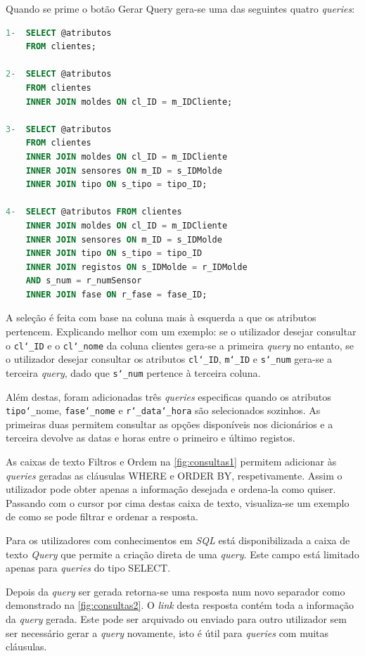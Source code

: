 \documentclass[11pt,twoside,a4paper]{report}
\begin{document}
\newpage
Quando  se prime o botão Gerar Query gera-se uma das seguintes quatro \textit{queries}:
\begin{lstlisting}[language = SQL]
1-	SELECT @atributos
	FROM clientes;
	
2-	SELECT @atributos
	FROM clientes
	INNER JOIN moldes ON cl_ID = m_IDCliente;
	
3-	SELECT @atributos
	FROM clientes
	INNER JOIN moldes ON cl_ID = m_IDCliente
	INNER JOIN sensores ON m_ID = s_IDMolde
	INNER JOIN tipo ON s_tipo = tipo_ID;
	
4-	SELECT @atributos FROM clientes
	INNER JOIN moldes ON cl_ID = m_IDCliente
	INNER JOIN sensores ON m_ID = s_IDMolde 
	INNER JOIN tipo ON s_tipo = tipo_ID
	INNER JOIN registos ON s_IDMolde = r_IDMolde
	AND s_num = r_numSensor
	INNER JOIN fase ON r_fase = fase_ID;
\end{lstlisting}
A seleção é feita com base na coluna mais à esquerda a que os atributos pertencem. Explicando melhor com um exemplo: se o utilizador desejar consultar o \texttt{cl\char`_ID} e o \texttt{cl\char`_nome} da coluna clientes gera-se a primeira \textit{query} no entanto, se o utilizador desejar consultar os atributos \texttt{cl\char`_ID}, \texttt{m\char`_ID} e \texttt{s\char`_num} gera-se a terceira \textit{query}, dado que \texttt{s\char`_num} pertence à terceira coluna.\par
Além destas, foram adicionadas três \textit{queries} especificas quando os atributos \texttt{tipo\char`_}nome, \texttt{fase\char`_nome} e \texttt{r\char`_data}\texttt{\char`_hora} são selecionados sozinhos. As primeiras duas permitem consultar as opções disponíveis nos dicionários e a terceira devolve as datas e horas entre o primeiro e último registos.\par
As caixas de texto Filtros e Ordem na \autoref{fig:consultas1} permitem adicionar às \textit{queries} geradas as cláusulas WHERE e ORDER BY, respetivamente. Assim o utilizador pode obter apenas a informação desejada e ordena-la como quiser. Passando com o cursor por cima destas caixa de texto, visualiza-se um exemplo de como se pode filtrar e ordenar a resposta.\par 
Para os utilizadores com conhecimentos em \textit{SQL} está disponibilizada a caixa de texto \textit{Query} que permite a criação direta de uma \textit{query}. Este campo está limitado apenas para \textit{queries} do tipo SELECT.\par
Depois da \textit{query} ser gerada retorna-se uma resposta num novo separador como demonstrado na \autoref{fig:consultas2}. O \textit{link} desta resposta contém toda a informação da \textit{query} gerada. Este pode ser arquivado ou enviado para outro utilizador sem ser necessário gerar a \textit{query} novamente, isto é útil para \textit{queries} com muitas cláusulas.\par
\end{document}
